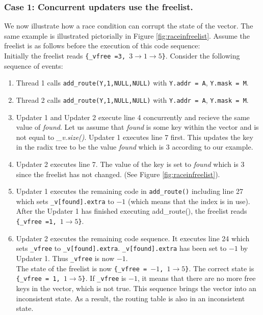 \documentclass[a4paper,marginparwidth=50pt,marginparsep=10pt]{article}
\begin{document}
\subsubsection{Case 1: Concurrent updaters use the freelist.}
We now illustrate how a race condition can corrupt the state of the vector. The same example is illustrated pictorially in Figure \ref{fig:raceinfreelist}.
Assume the freelist is as follows before the execution of this code sequence:\\
Initially the freelist reads \texttt{\{\_vfree =3, $3\rightarrow1 \rightarrow 5$\}}. Consider the following sequence of events:
\begin{enumerate}
\item Thread 1 calls \texttt{add\_route(Y,1,NULL,NULL)} with \texttt{Y.addr = A}, \texttt{Y.mask = M}.
\item Thread 2 calls \texttt{add\_route(Y,1,NULL,NULL)} with \texttt{Y.addr = A}, \texttt{Y.mask = M}.
\item Updater 1 and Updater 2 execute line 4 concurrently and recieve the same value of \emph{found}. Let us assume that \emph{found} is some key within the vector and is not equal to \emph{\_v.size()}. Updater 1 executes line 7 first. This updates the key in the radix tree to be the value \emph{found} which is $3$ according to our example.
\item Updater 2 executes line 7. The value of the key is set to \emph{found} which is $3$ since the freelist has not changed. (See Figure \ref{fig:raceinfreelist}).
\item Updater 1 executes the remaining code in \verb+add_route()+ including line 27 which sets  \verb+_v[found].extra+ to $-1$ (which means that the index is in use). After the Updater 1 has finished executing add\_route(), the freelist reads\\
\texttt{\{\_vfree =1, $1 \rightarrow 5$\}}.
\item Updater 2 executes the remaining code sequence. It executes line 24 which sets \texttt{\_vfree} to \texttt{\_v[found].extra}. \texttt{\_v[found].extra} has been set to $-1$ by Updater 1. Thus \texttt{\_vfree} is now $-1$.\\
The state of the freelist is now \texttt{\{\_vfree = $-1$, $1 \rightarrow 5$\}}. The correct state is \texttt{\{\_vfree = 1, $1 \rightarrow 5$\}}. If \texttt{\_vfree} is $-1$, it means that there are no more free keys in the vector, which is not true. This sequence brings the vector into an inconsistent state. As a result, the routing table is also in an inconsistent state.\\
\end{enumerate}
\end{document}
